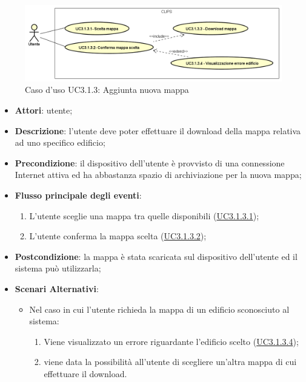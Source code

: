 \documentclass[../AnalisiDeiRequisiti.tex]{subfiles}
\begin{document}
        \begin{figure}[!h]
            \centering
            \includegraphics[scale=0.95, width=\textwidth]{img/UC3-1-3.png}
            \caption{Caso d'uso UC3.1.3: Aggiunta nuova mappa}\label{fig:UC3.1.3} 
        \end{figure}
\begin{itemize}
\item \textbf{Attori}: utente;
\item \textbf{Descrizione}: l'utente deve poter effettuare il download della mappa relativa ad uno specifico edificio; 
      \item \textbf{Precondizione}: il dispositivo dell'utente è provvisto di una connessione Internet attiva ed ha abbastanza spazio di archiviazione per la nuova mappa;

        \item \textbf{Flusso principale degli eventi}:
          \begin{enumerate}
          \item L'utente sceglie una mappa tra quelle disponibili (\hyperlink{UC3.1.3.1}{UC3.1.3.1});
          \item L'utente conferma la mappa scelta  (\hyperlink{UC3.1.3.2}{UC3.1.3.2});

      \end{enumerate}
    \item \textbf{Postcondizione}: la mappa è stata scaricata sul dispositivo dell'utente ed il sistema può utilizzarla;
    \item \textbf{Scenari Alternativi}:
    	\begin{itemize}
			\item Nel caso in cui l'utente richieda la mappa di un edificio sconosciuto al sistema:
			\begin{enumerate}
				\item Viene visualizzato un errore riguardante l'edificio scelto (\hyperlink{UC3.1.3.4}{UC3.1.3.4});
				\item viene data la possibilità all'utente di scegliere un'altra mappa di cui effettuare il download.
			\end{enumerate}
      	\end{itemize}
  \end{itemize}
\hypertarget{UC3.1.3.1}{}
\end{document}
